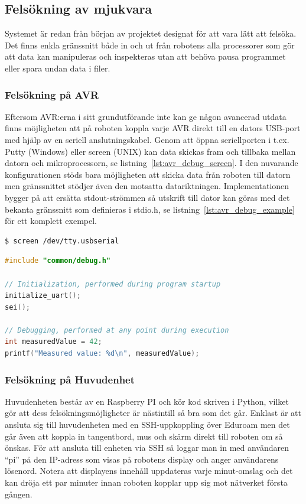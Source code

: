 \documentclass{article}
\begin{document}
\subsection{Felsökning av mjukvara}
Systemet är redan från början av projektet designat för att vara lätt att felsöka. Det finns enkla gränssnitt både in och ut från robotens alla processorer som gör att data kan manipuleras och inspekteras utan att behöva pausa programmet eller spara undan data i filer.

\subsubsection{Felsökning på AVR}
Eftersom AVR:erna i sitt grundutförande inte kan ge någon avancerad utdata finns möjligheten att på roboten koppla varje AVR direkt till en dators USB-port med hjälp av en seriell anslutningskabel. Genom att öppna seriellporten i t.ex. Putty (Windows) eller screen (UNIX) kan data skickas fram och tillbaka mellan datorn och mikroprocessorn, se listning~\ref{lst:avr_debug_screen}. I den nuvarande konfigurationen stöds bara möjligheten att skicka data från roboten till datorn men gränssnittet stödjer även den motsatta datariktningen. Implementationen bygger på att ersätta stdout-strömmen så utskrift till dator kan göras med det bekanta gränssnitt som definieras i stdio.h, se listning~\ref{lst:avr_debug_example} för ett komplett exempel.
\newline
\begin{lstlisting}[language=sh, label={lst:avr_debug_screen}, caption={Anslutning via screen}]
$ screen /dev/tty.usbserial
\end{lstlisting}

\begin{lstlisting}[language=C, label={lst:avr_debug_example}, caption=Exempel av utskrift]
#include "common/debug.h"

// Initialization, performed during program startup
initialize_uart();
sei();

// Debugging, performed at any point during execution
int measuredValue = 42;
printf("Measured value: %d\n", measuredValue);
\end{lstlisting}

\subsubsection{Felsökning på Huvudenhet}
Huvudenheten består av en Raspberry PI och kör kod skriven i Python, vilket gör att dess felsökningsmöjligheter är nästintill så bra som det går. Enklast är att ansluta sig till huvudenheten med en SSH-uppkoppling över Eduroam men det går även att koppla in tangentbord, mus och skärm direkt till roboten om så önskas. För att ansluta till enheten via SSH så loggar man in med användaren ``pi'' på den IP-adress som visas på robotens display och anger användarens lösenord. Notera att displayens innehåll uppdateras varje minut-omslag och det kan dröja ett par minuter innan roboten kopplar upp sig mot nätverket första gången.
\end{document}
